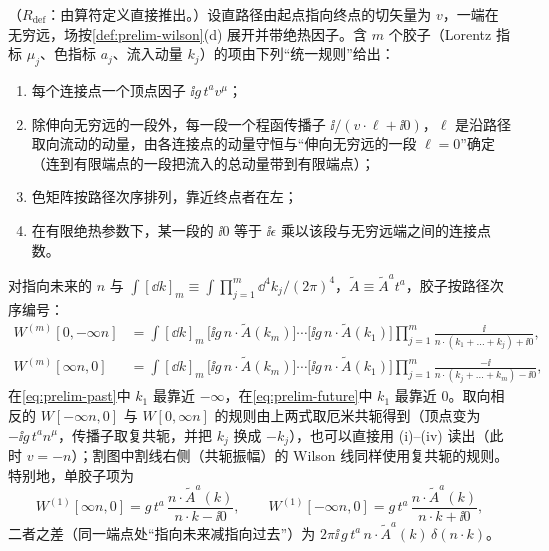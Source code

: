\begin{proposition}\label{prop:prelim-wilson-rules}
（$R_{\mathrm{def}}$：由算符定义直接推出。）设直路径由起点指向终点的切矢量为 $v$，一端在无穷远，场按\cref{def:prelim-wilson}(d) 展开并带绝热因子。含 $m$ 个胶子（Lorentz 指标 $\mu_j$、色指标 $a_j$、流入动量 $k_j$）的项由下列“统一规则”给出：
\begin{enumerate}[label=(\roman*),leftmargin=2.2em,itemsep=0pt,topsep=2pt]
\item 每个连接点一个顶点因子 $\ii g\,t^{a}v^{\mu}$；
\item 除伸向无穷远的一段外，每一段一个程函传播子 $\ii/(v\cdot\ell+\ii0)$，$\ell$ 是沿路径取向流动的动量，由各连接点的动量守恒与“伸向无穷远的一段 $\ell=0$”确定（连到有限端点的一段把流入的总动量带到有限端点）；
\item 色矩阵按路径次序排列，靠近终点者在左；
\item 在有限绝热参数下，某一段的 $\ii0$ 等于 $\ii\epsilon$ 乘以该段与无穷远端之间的连接点数。
\end{enumerate}
对指向未来的 $n$ 与 $\int[\dd k]_m\equiv\int\prod_{j=1}^m\dd^4k_j/(2\pi)^4$，$\tilde A\equiv\tilde A^at^a$，胶子按路径次序编号：%
\begin{align}
W^{(m)}[0,-\infty n]&=\int[\dd k]_m\,\big[\ii g\,n\cdot\tilde A(k_m)\big]\cdots\big[\ii g\,n\cdot\tilde A(k_1)\big]\prod_{j=1}^m\frac{\ii}{n\cdot(k_1+\dots+k_j)+\ii0},\label{eq:prelim-past}\\
W^{(m)}[\infty n,0]&=\int[\dd k]_m\,\big[\ii g\,n\cdot\tilde A(k_m)\big]\cdots\big[\ii g\,n\cdot\tilde A(k_1)\big]\prod_{j=1}^m\frac{-\ii}{n\cdot(k_j+\dots+k_m)-\ii0},\label{eq:prelim-future}
\end{align}
在\cref{eq:prelim-past}中 $k_1$ 最靠近 $-\infty$，在\cref{eq:prelim-future}中 $k_1$ 最靠近 $0$。取向相反的 $W[-\infty n,0]$ 与 $W[0,\infty n]$ 的规则由上两式取厄米共轭得到（顶点变为 $-\ii g\,t^an^\mu$，传播子取复共轭，并把 $k_j$ 换成 $-k_j$），也可以直接用 (i)--(iv) 读出（此时 $v=-n$）；割图中割线右侧（共轭振幅）的 Wilson 线同样使用复共轭的规则。特别地，单胶子项为
\begin{equation}\label{eq:prelim-one-gluon}
W^{(1)}[\infty n,0]=g\,t^a\,\frac{n\cdot\tilde A^a(k)}{n\cdot k-\ii0},\qquad W^{(1)}[-\infty n,0]=g\,t^a\,\frac{n\cdot\tilde A^a(k)}{n\cdot k+\ii0},
\end{equation}
二者之差（同一端点处“指向未来减指向过去”）为 $2\pi\ii\,g\,t^a\,n\cdot\tilde A^a(k)\,\delta(n\cdot k)$。
\end{proposition}

